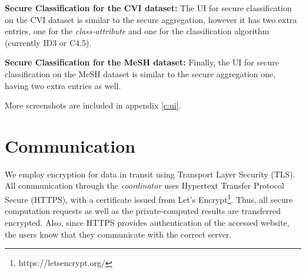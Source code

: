 \textbf{Secure Classification for the CVI dataset:} The UI for secure classification on the CVI dataset is similar to the secure aggregation, however it has two extra entries, one for the \emph{class\hyp attribute} and one for the classification algorithm (currently ID3 or C4.5).

\textbf{Secure Classification for the MeSH dataset:} Finally, the UI for secure classification on the MeSH dataset is similar to the secure aggregation one, having two extra entries as well.


More screenshots are included in appendix \ref{c:ui}.



\section{Communication}\label{s:impl-communication}
We employ encryption for data in transit using Transport Layer Security (TLS).
All communication through the \textit{coordinator} uses Hypertext Transfer Protocol Secure (HTTPS), with a certificate issued from Let's Encrypt\footnote{https://letsencrypt.org/}.
Thus, all secure computation requests as well as the private\hyp computed results are transferred encrypted.
Also, since HTTPS provides authentication of the accessed website, the users know that they communicate with the correct server.


